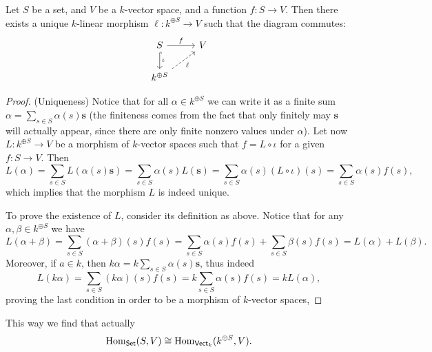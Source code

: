 \begin{proposition}
  \label{prop: universal property free vs}
  Let \(S\) be a set, and \(V\) be a \(k\)-vector space, and a function \(f : S
  \to V\). Then there exists a unique \(k\)-linear morphism \(\ell : k^{\oplus
  S} \to V\) such that the diagram commutes:
   \[
     \begin{tikzcd}
       S \ar[r, "f"] \ar[d, hook, "\iota"] &V \\
       k^{\oplus S} \ar[ru, dashed, swap, "\ell"]
     \end{tikzcd}
   \]
\end{proposition}

\begin{proof}
   (Uniqueness) Notice that for all \(\alpha \in k^{\oplus S}\) we can write it
   as a finite sum \(\alpha = \sum_{s \in S}\alpha(s) \mathbf s\) (the
   finiteness comes from the fact that only finitely may \(\mathbf s\) will
   actually appear, since there are only finite nonzero values under
   \(\alpha\)). Let now  \(L : k^{\oplus S} \to V\) be a morphism of
   \(k\)-vector spaces such that \(f = L \circ \iota\) for a given \(f : S \to
   V\). Then
   \[
      L(\alpha) = \sum_{s \in S} L(\alpha(s) \mathbf{s}) = \sum_{s \in S}
      \alpha(s) L(\mathbf s) = \sum_{s \in S} \alpha(s) (L \circ \iota)(s)
      = \sum_{s \in S} \alpha(s) f(s),
   \]
   which implies that the morphism \(L\) is indeed unique.

   To prove the existence of \(L\), consider its definition as above. Notice
   that for any \(\alpha, \beta \in k^{\oplus S}\) we have
   \[
      L(\alpha + \beta) = \sum_{s \in S} (\alpha + \beta)(s) f(s) = \sum_{s \in
      S} \alpha(s)f(s) + \sum_{s \in S} \beta(s)f(s) = L(\alpha) + L(\beta).
   \]
   Moreover, if \(a \in k\), then \(k \alpha = k\sum_{s \in S} \alpha(s)
   \mathbf s\), thus indeed
   \[
      L(k \alpha) = \sum_{s \in S} (k \alpha)(s) f(s) = k \sum_{s \in S}
      \alpha(s) f(s) = k L(\alpha),
   \]
   proving the last condition in order to be a morphism of \(k\)-vector spaces,
\end{proof}

This way we find that actually
\[
   \operatorname{Hom}_{\mathsf{Set}}(S, V) \cong \operatorname{Hom}_{\mathsf{Vect}_k}(k^{\oplus S}, V).
\]

